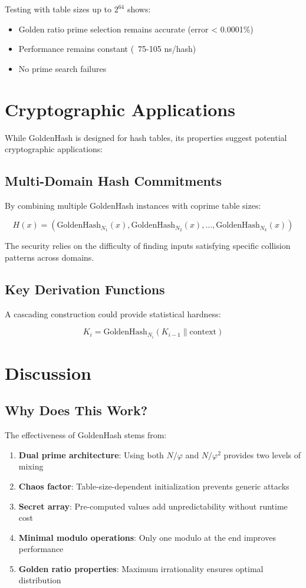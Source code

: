 \documentclass[11pt,a4paper]{article}
\theoremstyle{definition}
\begin{document}
Testing with table sizes up to $2^{64}$ shows:
\begin{itemize}
\item Golden ratio prime selection remains accurate (error < 0.0001\%)
\item Performance remains constant (~75-105 ns/hash)
\item No prime search failures
\end{itemize}

\section{Cryptographic Applications}

While GoldenHash is designed for hash tables, its properties suggest potential cryptographic applications:

\subsection{Multi-Domain Hash Commitments}

By combining multiple GoldenHash instances with coprime table sizes:

$$H(x) = \left(\text{GoldenHash}_{N_1}(x), \text{GoldenHash}_{N_2}(x), \ldots, \text{GoldenHash}_{N_k}(x)\right)$$

The security relies on the difficulty of finding inputs satisfying specific collision patterns across domains.

\subsection{Key Derivation Functions}

A cascading construction could provide statistical hardness:

$$K_i = \text{GoldenHash}_{N_i}(K_{i-1} \| \text{context})$$

\section{Discussion}

\subsection{Why Does This Work?}

The effectiveness of GoldenHash stems from:
\begin{enumerate}
\item \textbf{Dual prime architecture}: Using both $N/\varphi$ and $N/\varphi^2$ provides two levels of mixing
\item \textbf{Chaos factor}: Table-size-dependent initialization prevents generic attacks
\item \textbf{Secret array}: Pre-computed values add unpredictability without runtime cost
\item \textbf{Minimal modulo operations}: Only one modulo at the end improves performance
\item \textbf{Golden ratio properties}: Maximum irrationality ensures optimal distribution
\end{enumerate}
\end{document}
